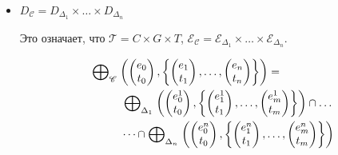 \begin{itemize}

\item  $D_{\mathscr{C}} = D_{\Delta_1} \times \dots \times D_{\Delta_n}$

Это означает, что $\mathcal{T} = C \times G \times T$, $\mathcal{E}_{\mathscr{C}} = \mathcal{E}_{\Delta_1} \times \dots \times \mathcal{E}_{\Delta_n}$.

\begin{equation}
\label{composite_epp_def}
\begin{aligned}
& \mathrel{\bigoplus}_{\mathscr{C}}
\left(
\begin{pmatrix}
e_0 \\
t_0 
\end{pmatrix},
\left\{
\begin{pmatrix}
e_1 \\
t_1 
\end{pmatrix},
\dots ,
\begin{pmatrix}
e_n \\
t_n 
\end{pmatrix}
\right\}
\right) = \\
& \hspace{1cm} \mathrel{\bigoplus}_{\Delta_1}
\left(
\begin{pmatrix}
e^1_0 \\
t_0 
\end{pmatrix},
\left\{
\begin{pmatrix}
e^1_1 \\
t_1 
\end{pmatrix},
\dots ,
\begin{pmatrix}
e^1_m \\
t_m 
\end{pmatrix}
\right\}
\right) \cap \dots \\
& \hspace{1cm} \dots \cap 
\mathrel{\bigoplus}_{\Delta_n}
\left(
\begin{pmatrix}
e^n_0 \\
t_0 
\end{pmatrix},
\left\{
\begin{pmatrix}
e^n_1 \\
t_1 
\end{pmatrix},
\dots ,
\begin{pmatrix}
e^n_m \\
t_m 
\end{pmatrix}
\right\}
\right)  
\end{aligned}
\end{equation}


\end{itemize}
